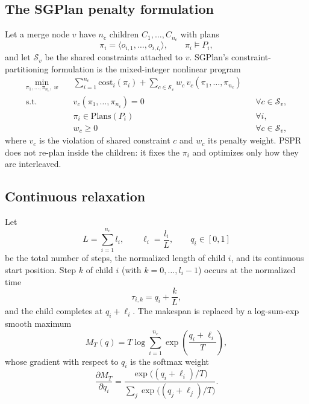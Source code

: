 \documentclass[11pt,a4paper]{article}
\newcommand{\cS}{\mathcal{S}}
\begin{document}
\subsection{The SGPlan penalty formulation}
Let a merge node $v$ have $n_c$ children $C_1,\dots,C_{n_c}$ with plans
\begin{equation}
\pi_i=\langle o_{i,1},\dots,o_{i,l_i}\rangle,
\qquad
\pi_i\models P_i,
\end{equation}
and let $\cS_v$ be the shared constraints attached to $v$. SGPlan's
constraint-partitioning formulation is the mixed-integer nonlinear program
\begin{equation}
\begin{aligned}
\min_{\pi_1,\dots,\pi_{n_c},\;w}\quad &
\sum_{i=1}^{n_c}\mathrm{cost}_i(\pi_i)
+\sum_{c\in\cS_v}w_c\,v_c(\pi_1,\dots,\pi_{n_c})\\
\text{s.t.}\quad &
v_c(\pi_1,\dots,\pi_{n_c})=0 && \forall c\in\cS_v,\\
& \pi_i\in\mathrm{Plans}(P_i) && \forall i,\\
& w_c\ge0 && \forall c\in\cS_v,
\end{aligned}
\label{eq:minlp}
\end{equation}
where $v_c$ is the violation of shared constraint $c$ and $w_c$ its penalty
weight. PSPR does not re-plan inside the children: it fixes the $\pi_i$ and
optimizes only how they are interleaved.

\subsection{Continuous relaxation}
Let
\begin{equation}
L=\sum_{i=1}^{n_c}l_i,
\qquad
\ell_i=\frac{l_i}{L},
\qquad
q_i\in[0,1]
\end{equation}
be the total number of steps, the normalized length of child $i$, and its
continuous start position. Step $k$ of child $i$ (with $k=0,\dots,l_i-1$)
occurs at the normalized time
\begin{equation}
\tau_{i,k}=q_i+\frac{k}{L},
\end{equation}
and the child completes at $q_i+\ell_i$. The makespan is replaced by a
log-sum-exp smooth maximum
\begin{equation}
M_T(q)=T\log\sum_{i=1}^{n_c}
\exp\!\left(\frac{q_i+\ell_i}{T}\right),
\label{eq:smoothmax}
\end{equation}
whose gradient with respect to $q_i$ is the softmax weight
\begin{equation}
\frac{\partial M_T}{\partial q_i}
=
\frac{\exp\!\bigl((q_i+\ell_i)/T\bigr)}
{\sum_{j}\exp\!\bigl((q_j+\ell_j)/T\bigr)}.
\end{equation}
\end{document}
